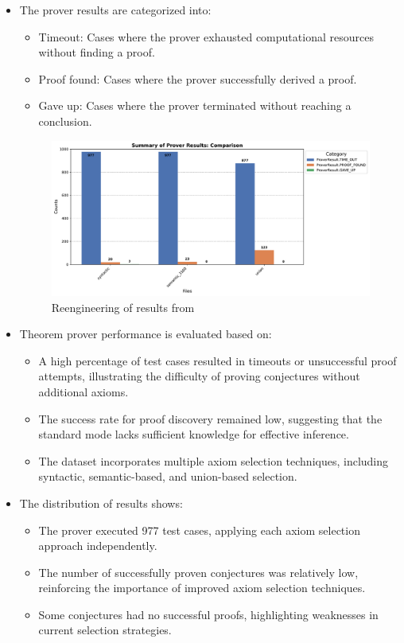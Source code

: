 \documentclass[english,version-2020-11]{uzl-thesis}
\begin{document}
\begin{itemize}
    \item The prover results are categorized into:
    \begin{itemize}
        \item Timeout: Cases where the prover exhausted computational resources without finding a proof.
        \item Proof found: Cases where the prover successfully derived a proof.
        \item Gave up: Cases where the prover terminated without reaching a conclusion.
    \end{itemize}

    \begin{figure}[h!]
        \centering
        \includegraphics[width=\textwidth]{standard_mode_noAdded_output.pdf}
        \caption{Reengineering of results from \cite{Schon2024}}
        \label{fig:reengineering}
    \end{figure}

    \FloatBarrier

    \item Theorem prover performance is evaluated based on:
    \begin{itemize}
        \item A high percentage of test cases resulted in timeouts or unsuccessful proof attempts, illustrating the difficulty of proving conjectures without additional axioms.
        \item The success rate for proof discovery remained low, suggesting that the standard mode lacks sufficient knowledge for effective inference.
        \item The dataset incorporates multiple axiom selection techniques, including syntactic, semantic-based, and union-based selection.
    \end{itemize}

    \item The distribution of results shows:
    \begin{itemize}
        \item The prover executed 977 test cases, applying each axiom selection approach independently.
        \item The number of successfully proven conjectures was relatively low, reinforcing the importance of improved axiom selection techniques.
        \item Some conjectures had no successful proofs, highlighting weaknesses in current selection strategies.
    \end{itemize}


\end{itemize}
\end{document}
